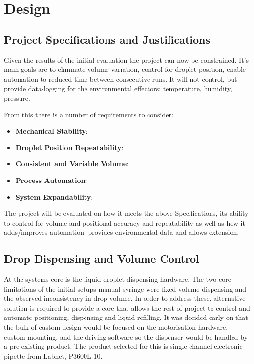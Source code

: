 \chapter{Design}\label{C:des}

\section{Project Specifications and Justifications}
Given the results of the initial evaluation the project can now be constrained. It's main goals are to eliminate volume variation, control for droplet position, enable automation to reduced time between consecutive runs. It will not control, but provide data-logging for the environmental effectors; temperature, humidity, pressure.

From this there is a number of requirements to consider:

\begin{itemize}
    \item \textbf{Mechanical Stability}:
    \item \textbf{Droplet Position Repeatability}: 
    \item \textbf{Consistent and Variable Volume}: 
    \item \textbf{Process Automation}: 
    \item \textbf{System Expandability}:
\end{itemize}

The project will be evaluated on how it meets the above Specifications, its ability to control for volume and positional accuracy and repeatability as well as how it adds/improves automation, provides environmental data and allows extension.


\section{Drop Dispensing and Volume Control}

At the systems core is the liquid droplet dispensing hardware. The two core limitations of the initial setups manual syringe were fixed volume dispensing and the observed inconsistency in drop volume. In order to address these, alternative solution is required to provide a core that allows the rest of project to control and automate positioning, dispensing and liquid refilling. It was decided early on that the bulk of custom design would be focused on the motorisation hardware, custom mounting, and the driving software so the dispenser would be handled by a pre-existing product. The product selected for this is single channel electronic pipette from Labnet, P3600L-10. 


